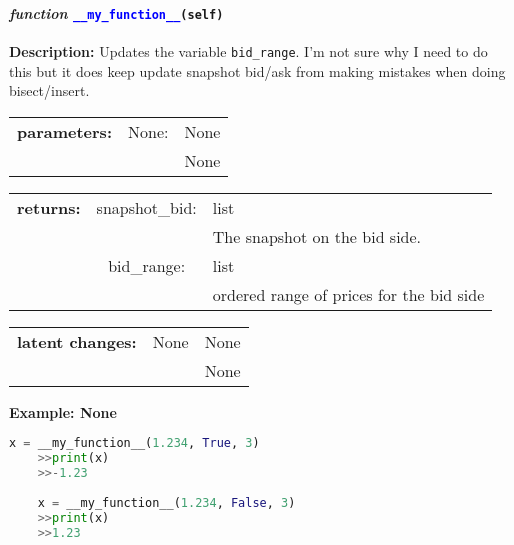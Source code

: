 \paragraph{\textit{function} \textcolor{blue}{\texttt{\_\_my\_function\_\_}}\texttt{(self)}}\hfill\break
\noindent \textbf{Description:} Updates the variable \texttt{bid\_range}. I'm not sure why I need to do this but it does keep update snapshot bid/ask from making mistakes when doing bisect/insert. 


\begin{tabular}{r r l }
	\textbf{parameters:}	& None: & None\\
	&  & None\\
\end{tabular}

\begin{tabular}{l c l}
	\textbf{returns:} & snapshot\_bid: & list\\
	& & The snapshot on the bid side. \\
	& bid\_range: & list\\
	&& ordered range of prices for the bid side \\
\end{tabular}

\begin{tabular}{l c l}
	\textbf{latent changes:} & None & None\\
	& &  None
\end{tabular}

\textbf{Example: None}
\begin{lstlisting}[language=Python]
	x = __my_function__(1.234, True, 3)
	>>print(x)
	>>-1.23
	
	x = __my_function__(1.234, False, 3)
	>>print(x)
	>>1.23
\end{lstlisting}